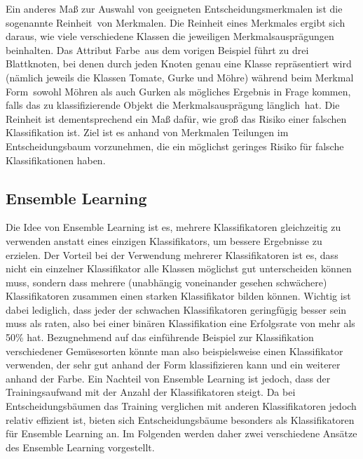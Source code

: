 Ein anderes Maß zur Auswahl von geeigneten Entscheidungsmerkmalen ist die sogenannte \glqq Reinheit\grqq\ von Merkmalen. Die Reinheit eines Merkmales ergibt sich daraus, wie viele verschiedene Klassen die jeweiligen Merkmalsausprägungen beinhalten. Das Attribut \glqq Farbe\grqq\ aus dem vorigen Beispiel führt zu drei Blattknoten, bei denen durch jeden Knoten genau eine Klasse repräsentiert wird (nämlich jeweils die Klassen Tomate, Gurke und Möhre) während beim Merkmal \glqq Form\grqq\ sowohl Möhren als auch Gurken als mögliches Ergebnis in Frage kommen, falls das zu klassifizierende Objekt die Merkmalsausprägung \glqq länglich\grqq\ hat. Die Reinheit ist dementsprechend ein Maß dafür, wie groß das Risiko einer falschen Klassifikation ist. Ziel ist es anhand von Merkmalen Teilungen im Entscheidungsbaum vorzunehmen, die ein möglichst geringes Risiko für falsche Klassifikationen haben.


\subsection{Ensemble Learning}
Die Idee von Ensemble Learning ist es, mehrere Klassifikatoren gleichzeitig zu verwenden anstatt eines einzigen Klassifikators, um bessere Ergebnisse zu erzielen. Der Vorteil bei der Verwendung mehrerer Klassifikatoren ist es, dass nicht ein einzelner Klassifikator alle Klassen möglichst gut unterscheiden können muss, sondern dass mehrere (unabhängig voneinander gesehen schwächere) Klassifikatoren zusammen einen starken Klassifikator bilden können. Wichtig ist dabei lediglich, dass jeder der schwachen Klassifikatoren geringfügig besser sein muss als raten, also bei einer binären Klassifikation eine Erfolgsrate von mehr als 50\% hat.
Bezugnehmend auf das einführende Beispiel zur Klassifikation verschiedener Gemüsesorten könnte man also beispielsweise einen Klassifikator verwenden, der sehr gut anhand der Form klassifizieren kann und ein weiterer anhand der Farbe. Ein Nachteil von Ensemble Learning ist jedoch, dass der Trainingsaufwand mit der Anzahl der Klassifikatoren steigt. Da bei Entscheidungsbäumen das Training verglichen mit anderen Klassifikatoren jedoch relativ effizient ist, bieten sich Entscheidungsbäume besonders als Klassifikatoren für Ensemble Learning an. Im Folgenden werden daher zwei verschiedene Ansätze des Ensemble Learning vorgestellt.


